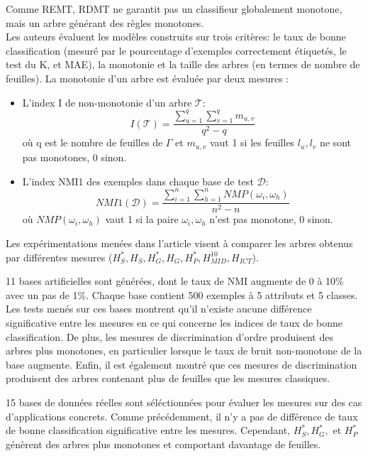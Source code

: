 \documentclass[a4paper]{article}
\begin{document}
\noindent Comme REMT, RDMT ne garantit pas un classifieur globalement monotone, mais
un arbre générant des règles monotones.  \\

Les auteurs évaluent les modèles construits sur trois critères: le taux de bonne
classification (mesuré par le pourcentage d'exemples correctement étiquetés, le
test du K, et MAE), la monotonie et la taille des arbres (en termes de nombre de
feuilles). 
\noindent La monotonie d'un arbre est évaluée par deux mesures :
\begin{itemize}
    \item L'index I de non-monotonie d'un arbre $\mathcal{T}$:  
        $$ I(\mathcal{T}) = \frac{\sum_{u=1}^q \sum_{v=1}^{q} m_{u,v}}{q^2 - q}$$
        où q est le nombre de feuilles de $\Gamma$ et $m_{u,v}$ vaut 1 si les
        feuilles $l_u, l_v$ ne sont pas monotones, 0 sinon.
    \item L'index NMI1 des exemples dans chaque base de test $\mathcal{D}$:
        $$ NMI1(\mathcal{D}) = \frac{\sum_{i=1}^n \sum_{h=1}^{n} NMP(\omega_i,
        \omega_h)}{n^2 - n}$$
        où $NMP(\omega_i, \omega_h)$ vaut 1 si la paire $\omega_i, \omega_h$
        n'est pas monotone, 0 sinon. \\
\end{itemize}

Les expérimentations menées dans l'article visent à comparer les arbres obtenus
par différentes mesures ($H^*_S, H_S, H^*_G, H_G, H^*_P, H^{10}_{MID}, H_{ICT}$).

11 bases artificielles sont générées, dont le taux de NMI augmente de 0 à 10\%
avec un pas de 1\%. Chaque base contient 500 exemples à 5 attributs et 5
classes. \\
\noindent Les tests menés sur ces bases montrent qu'il n'existe aucune
différence significative entre les mesures en ce qui concerne les indices de
taux de bonne classification. De plus, les mesures de discrimination d'ordre
produisent des arbres plus monotones, en particulier lorsque le taux de bruit
non-monotone de la base augmente. Enfin, il est également montré que ces mesures
de discrimination produisent des arbres contenant plus de feuilles que les
mesures classiques.

15 bases de données réelles sont séléctionnées pour évaluer les mesures sur des
cas d'applications concrets. Comme précédemment, il n'y a pas de différence
de taux de bonne classification significative entre les mesures. Cependant,
$H^*_S, H^*_G,$ et $H^*_P$ génèrent des arbres plus monotones et comportant
davantage de feuilles. \\
\end{document}
